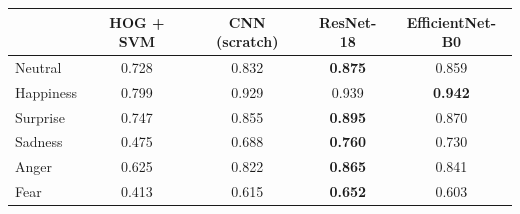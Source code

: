 \begin{tabular}{lcccc}
\toprule
 & HOG + SVM & CNN (scratch) & ResNet-18 & EfficientNet-B0 \\
\midrule
Neutral & 0.728 & 0.832 & \bfseries 0.875 & 0.859 \\
Happiness & 0.799 & 0.929 & 0.939 & \bfseries 0.942 \\
Surprise & 0.747 & 0.855 & \bfseries 0.895 & 0.870 \\
Sadness & 0.475 & 0.688 & \bfseries 0.760 & 0.730 \\
Anger & 0.625 & 0.822 & \bfseries 0.865 & 0.841 \\
Fear & 0.413 & 0.615 & \bfseries 0.652 & 0.603 \\
\bottomrule
\end{tabular}
